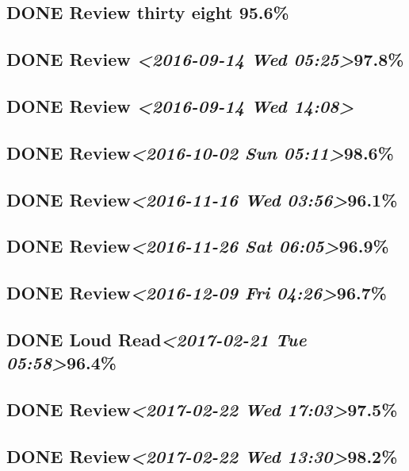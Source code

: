 \documentclass[11pt]{ctexart}
\begin{document}
\subsection{{\bfseries\sffamily DONE} Review thirty eight 95.6\%}
\label{sec:org937f6f6}

\subsection{{\bfseries\sffamily DONE} Review \textit{<2016-09-14 Wed 05:25>}97.8\%}
\label{sec:orgf834b27}
\subsection{{\bfseries\sffamily DONE} Review \textit{<2016-09-14 Wed 14:08>}}
\label{sec:orgf493b31}
\subsection{{\bfseries\sffamily DONE} Review\textit{<2016-10-02 Sun 05:11>}98.6\%}
\label{sec:orgd98193a}
\subsection{{\bfseries\sffamily DONE} Review\textit{<2016-11-16 Wed 03:56>}96.1\%}
\label{sec:org8a4714d}
\subsection{{\bfseries\sffamily DONE} Review\textit{<2016-11-26 Sat 06:05>}96.9\%}
\label{sec:org1301066}
\subsection{{\bfseries\sffamily DONE} Review\textit{<2016-12-09 Fri 04:26>}96.7\%}
\label{sec:orgbecdb89}
\subsection{{\bfseries\sffamily DONE} Loud Read\textit{<2017-02-21 Tue 05:58>}96.4\%}
\label{sec:orgfd93cd1}
\subsection{{\bfseries\sffamily DONE} Review\textit{<2017-02-22 Wed 17:03>}97.5\%}
\label{sec:org486f3fe}
\subsection{{\bfseries\sffamily DONE} Review\textit{<2017-02-22 Wed 13:30>}98.2\%}
\label{sec:org5251d9f}
\end{document}
